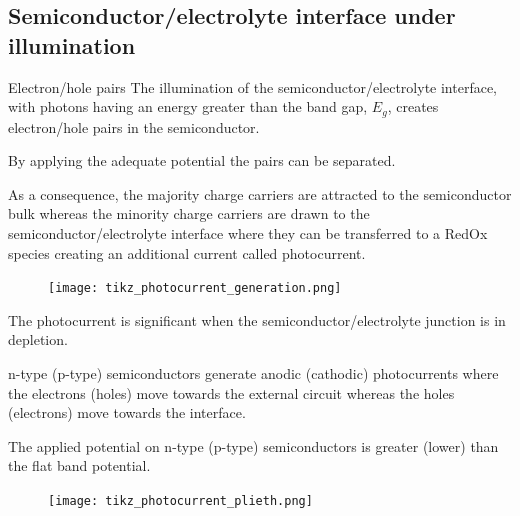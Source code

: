 \documentclass[10pt,compress]{beamer}
\begin{document}
\subsection{Semiconductor/electrolyte interface under illumination}
    \begin{frame}[allowframebreaks=1.0]{Electron/hole pairs}
        The illumination of the semiconductor/electrolyte interface, 
        with photons having an energy greater than the band gap, $E_g$, creates 
        electron/hole pairs in the semiconductor. 
        
        By applying the adequate potential the pairs can be separated. 
        
        As a consequence, the majority charge carriers are attracted to the 
        semiconductor bulk whereas the minority charge carriers are drawn to the 
        semiconductor/electrolyte interface where they can be transferred to a RedOx 
        species creating an additional current called photocurrent. 
    
        \begin{figure}[h]
            \centering
            \texttt{[image: tikz\_photocurrent\_generation.png]}
            \label{fig_photocurrent_generation}
        \end{figure}
    
        The photocurrent is significant when the semiconductor/electrolyte junction 
        is in depletion. 
        
        n-type (p-type) 
        semiconductors generate anodic (cathodic) photocurrents where the 
        electrons (holes) move towards the external circuit whereas the holes (electrons) 
        move towards the interface. 
        
        The applied potential on n-type (p-type) semiconductors is 
        greater (lower) than the flat band potential. 

        \begin{figure}[h]
            \centering
            \texttt{[image: tikz\_photocurrent\_plieth.png]}
            \label{fig_photocurrent_plieth}
        \end{figure}

    \end{frame}
\end{document}
